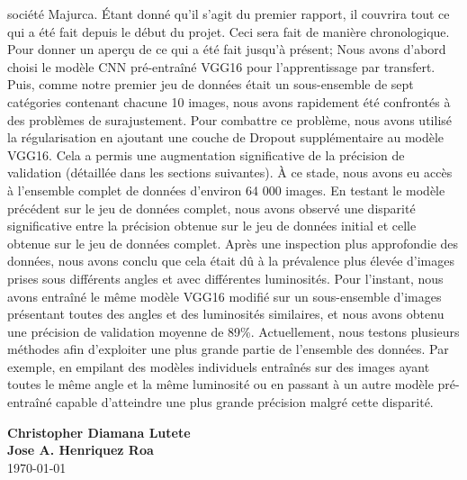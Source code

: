 \documentclass[11pt]{article}
\begin{document}
\begin{titlepage}
  société Majurca. Étant donné qu'il s'agit du premier rapport, il couvrira tout
  ce qui a été fait depuis le début du projet. Ceci sera fait de manière
  chronologique. Pour donner un aperçu de ce qui a été fait jusqu'à présent;
  Nous avons d'abord choisi le modèle CNN pré-entraîné VGG16 pour
  l'apprentissage par transfert. Puis, comme notre premier jeu de données était
  un sous-ensemble de sept catégories contenant chacune 10 images, nous avons
  rapidement été confrontés à des problèmes de surajustement. Pour combattre ce
  problème, nous avons utilisé la régularisation en ajoutant une couche de
  Dropout supplémentaire au modèle VGG16. Cela a permis une augmentation
  significative de la précision de validation (détaillée dans les sections
  suivantes). À ce stade, nous avons eu accès à l'ensemble complet de données
  d'environ 64 000 images. En testant le modèle précédent sur le jeu de données
  complet, nous avons observé une disparité significative entre la précision
  obtenue sur le jeu de données initial et celle obtenue sur le jeu de données
  complet. Après une inspection plus approfondie des données, nous avons conclu
  que cela était dû à la prévalence plus élevée d'images prises sous différents
  angles et avec différentes luminosités. Pour l'instant, nous avons entraîné le
  même modèle VGG16 modifié sur un sous-ensemble d'images présentant toutes des
  angles et des luminosités similaires, et nous avons obtenu une précision de
  validation moyenne de 89\%. Actuellement, nous testons plusieurs méthodes afin
  d'exploiter une plus grande partie de l'ensemble des données. Par exemple, en
  empilant des modèles individuels entraînés sur des images ayant toutes le même
  angle et la même luminosité ou en passant à un autre modèle pré-entraîné
  capable d'atteindre une plus grande précision malgré cette disparité.
  \begin{center}
    \vfill \normalsize \textbf{Christopher Diamana Lutete}\\
    \textbf{Jose A. Henriquez Roa}\\
    \vspace*{2\baselineskip} \today \rhead{\today}
    \newpage
  \end{center}
\end{titlepage}
\end{document}
